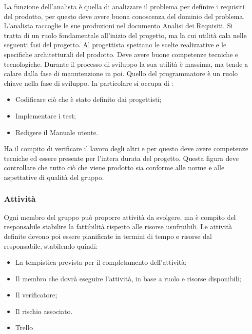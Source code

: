 La funzione dell'analista è quella di analizzare il problema per definire i requisiti del prodotto, per questo deve avere buona conoscenza del dominio del problema. L'analista raccoglie le sue produzioni nel documento Analisi dei Requisiti. Si tratta di un ruolo fondamentale all'inizio del progetto, ma la cui utilità cala nelle seguenti fasi del progetto.
Al progettista spettano le scelte realizzative e le specifiche architetturali del prodotto. Deve avere buone competenze tecniche e tecnologiche. Durante il processo di sviluppo la sua utilità è massima, ma tende a calare dalla fase di manutenzione in poi.
Quello del programmatore è un ruolo chiave nella fase di sviluppo. In particolare si occupa di :
\begin{itemize}
    \item Codificare ciò che è stato definito dai progettisti;
    \item Implementare i test;
    \item Redigere il Manuale utente.
\end{itemize}
Ha il compito di verificare il lavoro degli altri e per questo deve avere competenze tecniche ed essere presente per l'intera durata del progetto. Questa figura deve controllare che tutto ciò che viene prodotto sia conforme alle norme e alle aspettative di qualità del gruppo.


\subsubsection{Attività}
Ogni membro del gruppo può proporre attività da svolgere, ma è compito del responsabile stabilire la fattibilità rispetto alle risorse usufruibili. 
Le attività definite devono poi essere pianificate in termini di tempo e risorse dal responsabile, stabilendo quindi:
\begin{itemize}
    \item La tempistica prevista per il completamento dell'attività;
    \item Il membro che dovrà eseguire l'attività, in base a ruolo e risorse disponibili;
    \item Il verificatore;
    \item Il rischio associato.
\end{itemize}

    \begin{itemize}
        \item Trello
    \end{itemize}

